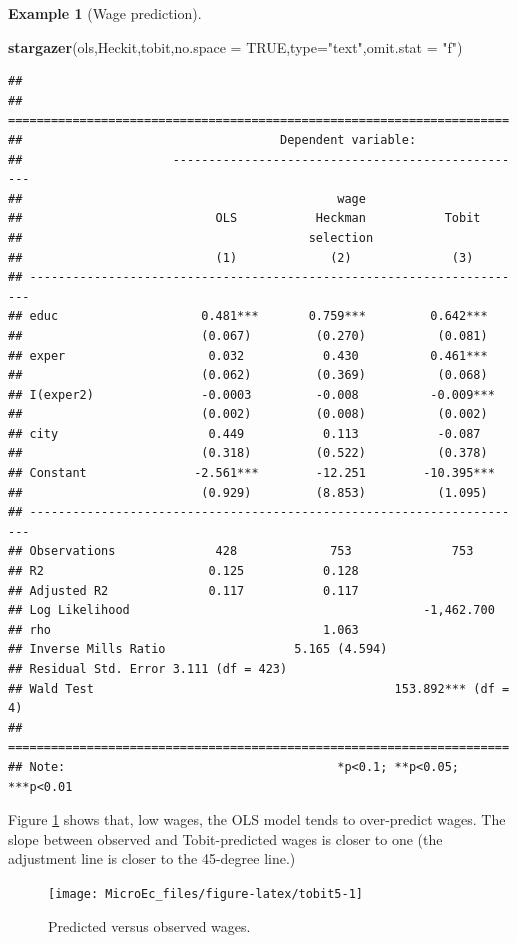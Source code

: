 \documentclass[
  12pt,
]{book}
\newenvironment{Shaded}{\begin{snugshade}}{\end{snugshade}}
\newcommand{\AttributeTok}[1]{\textcolor[rgb]{0.13,0.29,0.53}{#1}}
\newcommand{\ConstantTok}[1]{\textcolor[rgb]{0.56,0.35,0.01}{#1}}
\newcommand{\FunctionTok}[1]{\textcolor[rgb]{0.13,0.29,0.53}{\textbf{#1}}}
\newcommand{\NormalTok}[1]{#1}
\newcommand{\StringTok}[1]{\textcolor[rgb]{0.31,0.60,0.02}{#1}}
\theoremstyle{definition}
\theoremstyle{definition}
\newtheorem{example}{Example}[chapter]
\theoremstyle{definition}
\theoremstyle{definition}
\theoremstyle{remark}
\begin{document}
\begin{example}[Wage prediction]
\begin{Shaded}
\begin{Highlighting}[]
\FunctionTok{stargazer}\NormalTok{(ols,Heckit,tobit,}\AttributeTok{no.space =} \ConstantTok{TRUE}\NormalTok{,}\AttributeTok{type=}\StringTok{"text"}\NormalTok{,}\AttributeTok{omit.stat =} \StringTok{"f"}\NormalTok{)}
\end{Highlighting}
\end{Shaded}

\begin{verbatim}
## 
## ======================================================================
##                                    Dependent variable:                
##                     --------------------------------------------------
##                                            wage                       
##                           OLS           Heckman           Tobit       
##                                        selection                      
##                           (1)             (2)              (3)        
## ----------------------------------------------------------------------
## educ                    0.481***       0.759***         0.642***      
##                         (0.067)         (0.270)          (0.081)      
## exper                    0.032           0.430          0.461***      
##                         (0.062)         (0.369)          (0.068)      
## I(exper2)               -0.0003         -0.008          -0.009***     
##                         (0.002)         (0.008)          (0.002)      
## city                     0.449           0.113           -0.087       
##                         (0.318)         (0.522)          (0.378)      
## Constant               -2.561***        -12.251        -10.395***     
##                         (0.929)         (8.853)          (1.095)      
## ----------------------------------------------------------------------
## Observations              428             753              753        
## R2                       0.125           0.128                        
## Adjusted R2              0.117           0.117                        
## Log Likelihood                                         -1,462.700     
## rho                                      1.063                        
## Inverse Mills Ratio                  5.165 (4.594)                    
## Residual Std. Error 3.111 (df = 423)                                  
## Wald Test                                          153.892*** (df = 4)
## ======================================================================
## Note:                                      *p<0.1; **p<0.05; ***p<0.01
\end{verbatim}

Figure \ref{fig:tobit5} shows that, low wages, the OLS model tends to over-predict wages. The slope between observed and Tobit-predicted wages is closer to one (the adjustment line is closer to the 45-degree line.)

\begin{figure}
\texttt{[image: MicroEc\_files/figure-latex/tobit5-1]} \caption{Predicted versus observed wages.}\label{fig:tobit5}
\end{figure}

\end{example}
\end{document}
